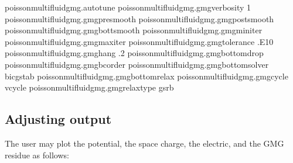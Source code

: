 \documentclass[letterpaper,10pt,english]{sphinxmanual}
\begin{document}
\begin{sphinxVerbatim}[commandchars=\\\{\},formatcom=\scriptsize]
poisson\PYGZus{}multifluid\PYGZus{}gmg.auto\PYGZus{}tune               
poisson\PYGZus{}multifluid\PYGZus{}gmg.gmg\PYGZus{}verbosity      \PYGZhy{}1        
poisson\PYGZus{}multifluid\PYGZus{}gmg.gmg\PYGZus{}pre\PYGZus{}smooth             
poisson\PYGZus{}multifluid\PYGZus{}gmg.gmg\PYGZus{}post\PYGZus{}smooth            
poisson\PYGZus{}multifluid\PYGZus{}gmg.gmg\PYGZus{}bott\PYGZus{}smooth            
poisson\PYGZus{}multifluid\PYGZus{}gmg.gmg\PYGZus{}min\PYGZus{}iter                
poisson\PYGZus{}multifluid\PYGZus{}gmg.gmg\PYGZus{}max\PYGZus{}iter               
poisson\PYGZus{}multifluid\PYGZus{}gmg.gmg\PYGZus{}tolerance      .E\PYGZhy{}10    
poisson\PYGZus{}multifluid\PYGZus{}gmg.gmg\PYGZus{}hang           .2       
poisson\PYGZus{}multifluid\PYGZus{}gmg.gmg\PYGZus{}bottom\PYGZus{}drop             
poisson\PYGZus{}multifluid\PYGZus{}gmg.gmg\PYGZus{}bc\PYGZus{}order                
poisson\PYGZus{}multifluid\PYGZus{}gmg.gmg\PYGZus{}bottom\PYGZus{}solver  bicgstab  
poisson\PYGZus{}multifluid\PYGZus{}gmg.gmg\PYGZus{}bottom\PYGZus{}relax           
poisson\PYGZus{}multifluid\PYGZus{}gmg.gmg\PYGZus{}cycle          vcycle    
poisson\PYGZus{}multifluid\PYGZus{}gmg.gmg\PYGZus{}relax\PYGZus{}type     gsrb      
\end{sphinxVerbatim}


\subsection{Adjusting output}
\label{\detokenize{Poisson:adjusting-output}}
The user may plot the potential, the space charge, the electric, and the GMG residue as follows:
\end{document}
